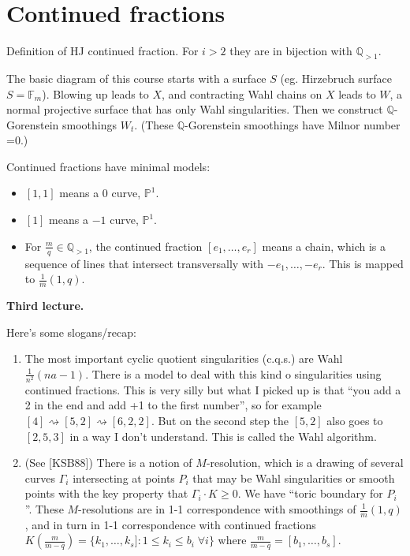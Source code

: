 \section{Continued fractions}
\label{section-continued-fractions}

Definition of HJ continued fraction. For $i>2$ they are in bijection with
$\mathbb{Q}_{>1}$.

The basic diagram of this course starts with a surface $S$ (eg. Hirzebruch
surface $S=\mathbb{F}_m$). Blowing up leads to $X$, and contracting Wahl chains
on $X$ leads to $W$, a normal projective surface that has only Wahl
singularities. Then we construct $\mathbb{Q}$-Gorenstein smoothings $W_t$.
(These  $\mathbb{Q}$-Gorenstein smoothings have Milnor number =0.)

Continued fractions have minimal models:
\begin{itemize}
\item $[1,1]$ means a 0 curve,  $\mathbb{P}^1$.
\item $[1]$ means a  $-1$ curve,  $\mathbb{P}^1$.
\item For $\frac{m}{q}\in\mathbb{Q}_{>1}$, the continued fraction
$[e_1,\ldots,e_r]$ means a chain, which is a sequence of lines that intersect
transversally with $-e_1,\ldots,-e_r$. This is mapped to $\frac{1}{m}(1,q)$.
\end{itemize}

\medskip\noindent

{\bf Third lecture.}

Here's some slogans/recap:
\begin{enumerate}
\item The most important cyclic quotient singularities (c.q.s.) are Wahl
$\frac{1}{n^2}(na-1)$. There is a model to deal with this kind o singularities
using continued fractions. This is very silly but what I picked up is that ``you
add a 2 in the end and add +1 to the first number'', so for example
$[4]\rightsquigarrow[5,2]\rightsquigarrow[6,2,2]$. But on the second step the
$[5,2]$ also goes to $[2,5,3]$ in a way I don't understand. This is called the
Wahl algorithm.
\item (See [KSB88]) There is a notion of $M$-resolution, which is a drawing of 
several curves $\Gamma_i$ intersecting at points $P_i$ that may be Wahl 
singularities or 
smooth points with the key property that $\Gamma_i\cdot K\geq 0$. We have
``toric boundary for $P_i$''. These $M$-resolutions are in 1-1 correspondence
with smoothings of $\frac{1}{m}(1,q)$, and in turn in 1-1 correspondence with
continued fractions $K\left(\frac{m}{m-q}\right)=\{k_1,\ldots,k_s]:
1\leq k_i\leq b_i\;\forall i\}$ where $\frac{m}{m-q}=[b_1,\ldots,b_s]$.
\end{enumerate}

